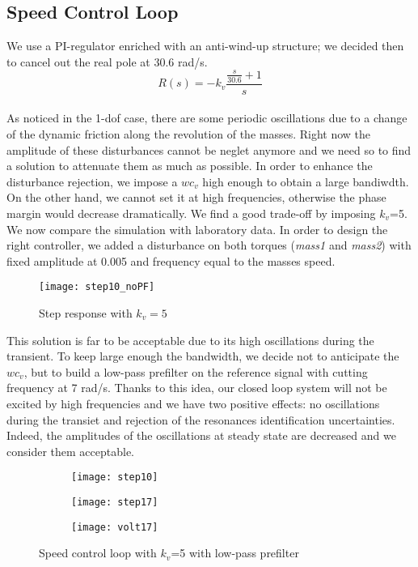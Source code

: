 \newpage 
\subsection{Speed Control Loop}
We use a PI-regulator enriched with an anti-wind-up structure; we decided then to cancel out the real pole at 30.6 rad/s.
\\
\[
R(s)=-k_v
\frac{\frac{s}{30.6}+1}{s}
\]
\\

As noticed in the 1-dof case, there are some periodic oscillations due to a change of the dynamic friction along the revolution of the masses. Right now the amplitude of these disturbances cannot be neglet anymore and we need so to find a solution to attenuate them as much as possible. In order to enhance the disturbance rejection, we impose a $wc_v$ high enough to obtain a large bandiwdth. On the other hand, we cannot set it at high frequencies, otherwise the phase margin would decrease dramatically. We find a good trade-off by imposing $k_v$=5.
We now compare the simulation with laboratory data. In order to design the right controller, we added a disturbance on both torques (\textit{mass1} and \textit{mass2}) with fixed amplitude at 0.005 and frequency equal to the masses speed.
\begin{figure*}[h]
	\centering
	\texttt{[image: step10\_noPF]}
	\caption{Step response with $k_v=5 $}
	\label{fig:step10_noPF}
\end{figure*}
\newline
This solution is far to be acceptable due to its high oscillations during the transient. To keep large enough the bandwidth, we decide not to anticipate the $wc_v$, but to build a low-pass prefilter on the reference signal with cutting frequency at 7 rad/s. Thanks to this idea, our closed loop system will not be excited by high frequencies and we have two positive effects: no oscillations during the transiet and rejection of the resonances identification uncertainties. Indeed, the amplitudes of the oscillations at steady state are decreased and we consider them acceptable. 

\newpage
\begin{figure*}[h]
	\centering
\begin{subfigure}{0.4\columnwidth}
	\texttt{[image: step10]}
\end{subfigure}
\begin{subfigure}{0.4\columnwidth}
	\texttt{[image: step17]}
\end{subfigure}
\begin{subfigure}{0.4\columnwidth}
	\texttt{[image: volt17]}
\end{subfigure}
\caption{Speed control loop with  $k_{v} $=5 with low-pass prefilter}
\label{fig:PI_with_5}
\end{figure*}


